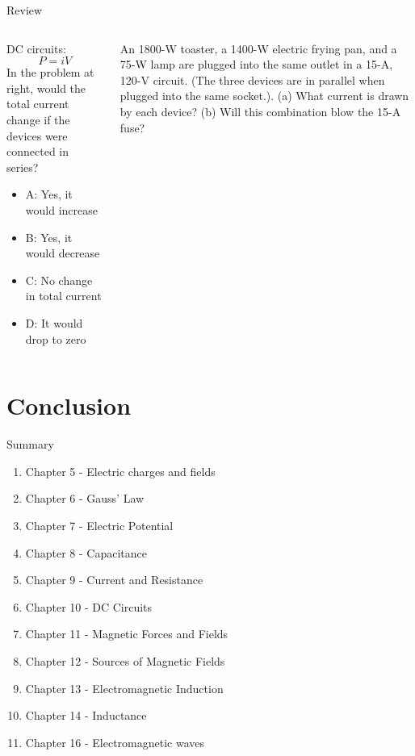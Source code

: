 \documentclass{beamer}
\begin{document}
\begin{frame}{Review}
\begin{columns}[T]
\begin{column}{0.45\textwidth}
\small
DC circuits:
\begin{equation}
P = i V
\end{equation}
In the problem at right, would the total current change if the devices were connected in series?
\begin{itemize}
\item A: Yes, it would increase
\item B: Yes, it would decrease
\item C: No change in total current
\item D: It would drop to zero
\end{itemize}
\end{column}
\begin{column}{0.65\textwidth}
An 1800-W toaster, a 1400-W electric frying pan, and a 75-W lamp are plugged into the same outlet in a 15-A, 120-V circuit. (The three devices are in parallel when plugged into the same socket.). (a) What current is drawn by each device? (b) Will this combination blow the 15-A fuse?
\end{column}
\end{columns}
\end{frame}

\section{Conclusion}

\begin{frame}{Summary}
\begin{enumerate}
\item Chapter 5 - Electric charges and fields
\item Chapter 6 - Gauss' Law
\item Chapter 7 - Electric Potential
\item Chapter 8 - Capacitance
\item Chapter 9 - Current and Resistance
\item Chapter 10 - DC Circuits
\item Chapter 11 - Magnetic Forces and Fields
\item Chapter 12 - Sources of Magnetic Fields
\item Chapter 13 - Electromagnetic Induction
\item Chapter 14 - Inductance
\item Chapter 16 - Electromagnetic waves
\end{enumerate}
\end{frame}
\end{document}
